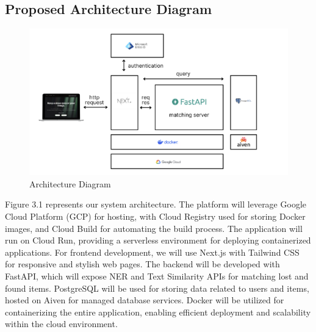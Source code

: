 \subsection{Proposed Architecture Diagram}
\begin{figure}[!h]
    \centering
    \includegraphics[width=1\linewidth]{chapter3/architecture-diagram.png}
    \caption{Architecture Diagram}
    \label{fig:Architecture Diagram}
\end{figure}
\par Figure 3.1 represents our system architecture. The platform will leverage Google Cloud Platform (GCP) for hosting, with Cloud Registry used for storing Docker images, and Cloud Build for automating the build process. The application will run on Cloud Run, providing a serverless environment for deploying containerized applications. For frontend development, we will use Next.js with Tailwind CSS for responsive and stylish web pages. The backend will be developed with FastAPI, which will expose NER and Text Similarity APIs for matching lost and found items. PostgreSQL will be used for storing data related to users and items, hosted on Aiven for managed database services. Docker will be utilized for containerizing the entire application, enabling efficient deployment and scalability within the cloud environment.

\newpage
